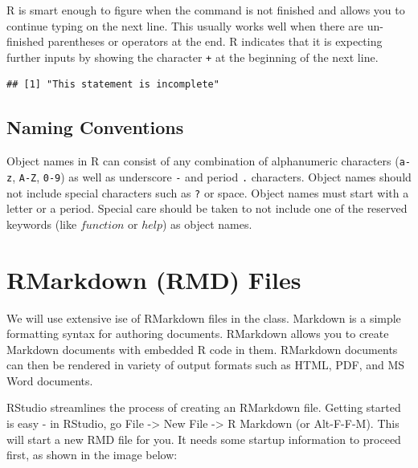 \documentclass[11pt, letterpaper, twoside]{memoir}\usepackage{knitr}
\begin{document}
R is smart enough to figure when the command is not finished and allows you to continue typing on the next line. This usually works well when there are un-finished parentheses or operators at the end. R indicates that it is expecting further inputs by showing the character \texttt{+} at the beginning of the next line. 

\begin{knitrout}
\color{fgcolor}\begin{kframe}
\begin{alltt}
\hlstd{(}
      \hlstd{)} 
\end{alltt}
\begin{verbatim}
## [1] "This statement is incomplete"
\end{verbatim}
\end{kframe}
\end{knitrout}

\subsection{Naming Conventions}

Object names in R can consist of any combination of alphanumeric characters (\texttt{a-z}, \texttt{A-Z}, \texttt{0-9}) as well as underscore \texttt{-} and period \texttt{.} characters. Object names should not include special characters such as \texttt{?} or space. Object names must start with a letter or a period. Special care should be taken to not include one of the reserved keywords (like $function$ or $help$) as object names.



\section{RMarkdown (RMD) Files}

We will use extensive ise of RMarkdown files in the class. Markdown is a simple formatting syntax for authoring documents. RMarkdown allows you to create Markdown documents with embedded R code in them. RMarkdown documents can then be rendered in variety of output formats such as HTML, PDF, and MS Word documents. 

RStudio streamlines the process of creating an RMarkdown file. Getting started is easy - in RStudio, go File -> New File -> R Markdown (or Alt-F-F-M). This will start a new RMD file for you. It needs some startup information to proceed first, as shown in the image below:
\end{document}
